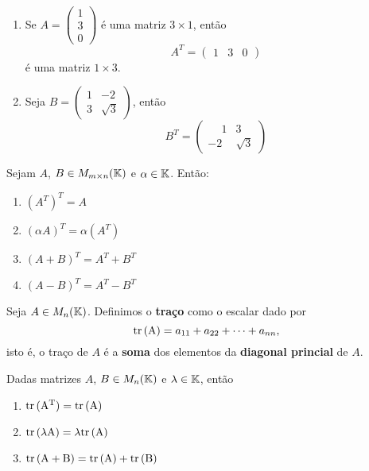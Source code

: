 \begin{exemplos}
\begin{enumerate}
        \item Se $A = \begin{pmatrix}1 \\ 3\\ 0\end{pmatrix}$ é uma matriz $3 \times 1$, então
            \[
                A^T = \begin{pmatrix}1 & 3 & 0\end{pmatrix}
            \]
            é uma matriz $1 \times 3$.

        \item Seja $B = \begin{pmatrix}1 & -2\\3 & \sqrt{3}\end{pmatrix}$, então
            \[
                B^T = \begin{pmatrix}
                    \phantom{-}1 & 3\\
                    -2 & \sqrt{3}
                \end{pmatrix}
            \]
    \end{enumerate}
\end{exemplos}


\begin{proposicao}
    Sejam $A$, $B \in M_{m \times n}(\mathbb{K})$ e $\alpha \in \mathbb{K}$. Então:
    \begin{enumerate}
        \item $(A^T)^T = A$

        \item $(\alpha A)^T = \alpha(A^T)$

        \item $(A + B)^T = A^T + B^T$

        \item $(A - B)^T = A^T - B^T$
    \end{enumerate}
\end{proposicao}

\begin{definicao}
    Seja $A \in M_n(\mathbb{K})$. Definimos o \textbf{traço} como o escalar dado por
    \[
        {\rm tr\,(A)} = a_{11} + a_{22} + \cdots + a_{nn},
    \]
    isto é, o traço de $A$ é a \textbf{soma} dos elementos da \textbf{diagonal princial} de $A$.
\end{definicao}

\begin{proposicao}
    Dadas matrizes $A$, $B \in M_n(\mathbb{K})$ e $\lambda \in \mathbb{K}$, então
    \begin{enumerate}
        \item ${\rm tr\,(A^T)} = {\rm tr\,(A)}$

        \item ${\rm tr\,(\lambda A)} = \lambda{\rm tr\,(A)}$

        \item ${\rm tr\,(A + B)} = {\rm tr\,(A)} + {\rm tr\,(B)}$
    \end{enumerate}
\end{proposicao}

